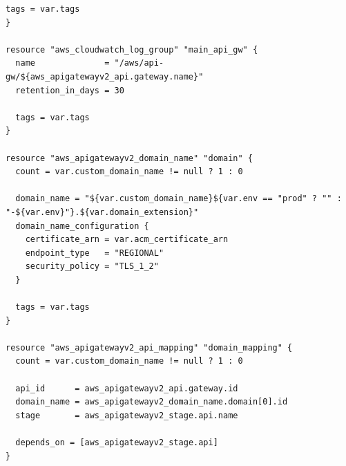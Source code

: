 \begin{lstlisting}[language=HCL, label={lst:gateway-core}]
  tags = var.tags
}

resource "aws_cloudwatch_log_group" "main_api_gw" {
  name              = "/aws/api-gw/${aws_apigatewayv2_api.gateway.name}"
  retention_in_days = 30

  tags = var.tags
}

resource "aws_apigatewayv2_domain_name" "domain" {
  count = var.custom_domain_name != null ? 1 : 0

  domain_name = "${var.custom_domain_name}${var.env == "prod" ? "" : "-${var.env}"}.${var.domain_extension}"
  domain_name_configuration {
    certificate_arn = var.acm_certificate_arn
    endpoint_type   = "REGIONAL"
    security_policy = "TLS_1_2"
  }

  tags = var.tags
}

resource "aws_apigatewayv2_api_mapping" "domain_mapping" {
  count = var.custom_domain_name != null ? 1 : 0

  api_id      = aws_apigatewayv2_api.gateway.id
  domain_name = aws_apigatewayv2_domain_name.domain[0].id
  stage       = aws_apigatewayv2_stage.api.name

  depends_on = [aws_apigatewayv2_stage.api]
}
\end{lstlisting}
